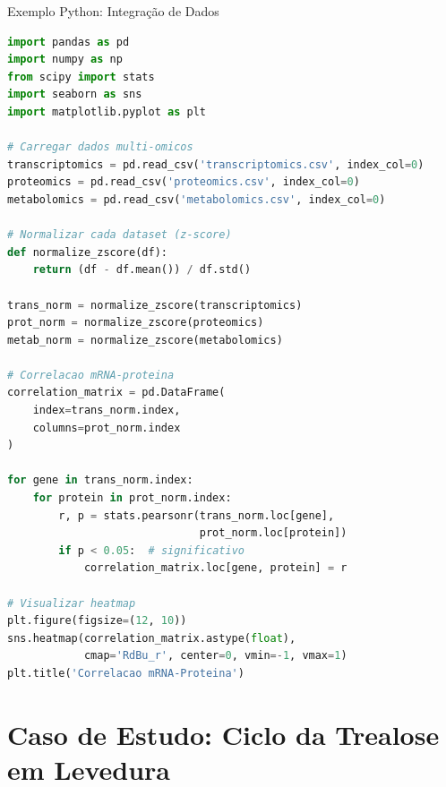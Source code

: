 \begin{frame}[fragile]{Exemplo Python: Integração de Dados}
\begin{lstlisting}[language=Python, caption=Integração multi-ômica com correlação, basicstyle=\ttfamily\scriptsize]
import pandas as pd
import numpy as np
from scipy import stats
import seaborn as sns
import matplotlib.pyplot as plt

# Carregar dados multi-omicos
transcriptomics = pd.read_csv('transcriptomics.csv', index_col=0)
proteomics = pd.read_csv('proteomics.csv', index_col=0)
metabolomics = pd.read_csv('metabolomics.csv', index_col=0)

# Normalizar cada dataset (z-score)
def normalize_zscore(df):
    return (df - df.mean()) / df.std()

trans_norm = normalize_zscore(transcriptomics)
prot_norm = normalize_zscore(proteomics)
metab_norm = normalize_zscore(metabolomics)

# Correlacao mRNA-proteina
correlation_matrix = pd.DataFrame(
    index=trans_norm.index,
    columns=prot_norm.index
)

for gene in trans_norm.index:
    for protein in prot_norm.index:
        r, p = stats.pearsonr(trans_norm.loc[gene],
                              prot_norm.loc[protein])
        if p < 0.05:  # significativo
            correlation_matrix.loc[gene, protein] = r

# Visualizar heatmap
plt.figure(figsize=(12, 10))
sns.heatmap(correlation_matrix.astype(float),
            cmap='RdBu_r', center=0, vmin=-1, vmax=1)
plt.title('Correlacao mRNA-Proteina')
\end{lstlisting}
\end{frame}

\section{Caso de Estudo: Ciclo da Trealose em Levedura}

